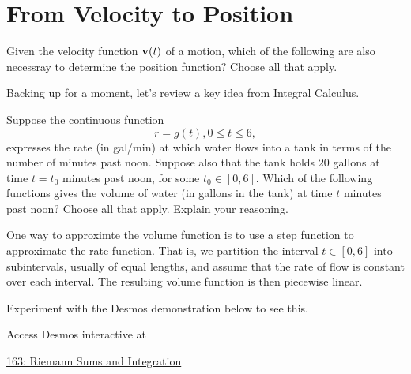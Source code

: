 \documentclass{ximera}
\begin{document}
\section{From Velocity to Position}


\begin{question}  \label{Qdst65nvcy}
Given the velocity function ${\bf v}(t)$ of a motion, which of the following are also necessray to determine the position function? Choose all that apply.
\begin{selectAll}  
  \end{selectAll}
\end{question}


Backing up for a moment, let's review a key idea from Integral Calculus.
\begin{question}  \label{Qddggt5t6vcy}
Suppose the continuous function 
\[
    r=g(t) , 0\leq t \leq 6 ,
\]
expresses the rate (in gal/min) at which water flows into a tank in terms of the number of minutes past noon. Suppose also that the tank holds $20$ gallons at time $t=t_0$ minutes past noon, for some $t_0\in [0,6]$. Which of the following functions gives the volume of water (in gallons in the tank) at time $t$ minutes past noon? Choose all that apply. Explain your reasoning.
\begin{selectAll}  
  \end{selectAll}
\end{question}

One way to approximte the volume function is to use a step function to approximate the rate function. That is, we partition the interval $t\in [0,6]$ into subintervals, usually of equal lengths, and assume that the rate of flow is constant over each interval. The resulting volume function is then piecewise linear. 

Experiment with the Desmos demonstration below to see this.

Access Desmos interactive at
 
\href{https://https://www.desmos.com/calculator/zswxfftnnk}{163: Riemann Sums and Integration}
\end{document}
